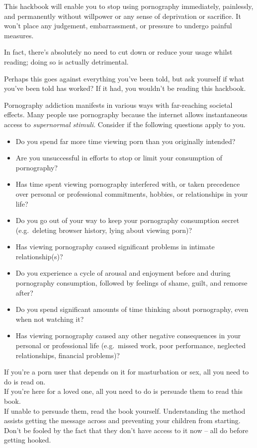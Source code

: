 \documentclass[
]{book}
\begin{document}
This hackbook will enable you to stop using pornography immediately, painlessly, and permanently without willpower or any sense of deprivation or sacrifice. It won't place any judgement, embarrassment, or pressure to undergo painful measures.

In fact, there's absolutely no need to cut down or reduce your usage whilst reading; doing so is actually detrimental.

Perhaps this goes against everything you've been told, but ask yourself if what you've been told has worked? If it had, you wouldn't be reading this hackbook.

Pornography addiction manifests in various ways with far-reaching societal effects. Many people use pornography because the internet allows instantaneous access to \emph{supernormal stimuli}. Consider if the following questions apply to you.

\begin{itemize}
\item
  Do you spend far more time viewing porn than you originally intended?
\item
  Are you unsuccessful in efforts to stop or limit your consumption of pornography?
\item
  Has time spent viewing pornography interfered with, or taken precedence over personal or professional commitments, hobbies, or relationships in your life?
\item
  Do you go out of your way to keep your pornography consumption secret (e.g.~deleting browser history, lying about viewing porn)?
\item
  Has viewing pornography caused significant problems in intimate relationship(s)?
\item
  Do you experience a cycle of arousal and enjoyment before and during pornography consumption, followed by feelings of shame, guilt, and remorse after?
\item
  Do you spend significant amounts of time thinking about pornography, even when not watching it?
\item
  Has viewing pornography caused any other negative consequences in your personal or professional life (e.g.~missed work, poor performance, neglected relationships, financial problems)?
\end{itemize}

If you're a porn user that depends on it for masturbation or sex, all you need to do is read on.\\
If you're here for a loved one, all you need to do is persuade them to read this book.\\
If unable to persuade them, read the book yourself. Understanding the method assists getting the message across and preventing your children from starting. Don't be fooled by the fact that they don't have access to it now -- all do before getting hooked.
\end{document}
